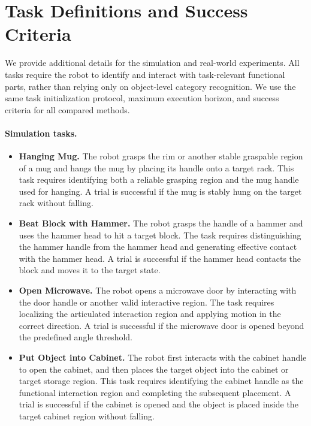 \section{Task Definitions and Success Criteria}
\label{app:tasks}

We provide additional details for the simulation and real-world experiments. All tasks require the robot to identify and interact with task-relevant functional parts, rather than relying only on object-level category recognition. We use the same task initialization protocol, maximum execution horizon, and success criteria for all compared methods.

\paragraph{Simulation tasks.}
\begin{itemize}
\item \textbf{Hanging Mug.} The robot grasps the rim or another stable graspable region of a mug and hangs the mug by placing its handle onto a target rack. This task requires identifying both a reliable grasping region and the mug handle used for hanging. A trial is successful if the mug is stably hung on the target rack without falling.

\item \textbf{Beat Block with Hammer.} The robot grasps the handle of a hammer and uses the hammer head to hit a target block. The task requires distinguishing the hammer handle from the hammer head and generating effective contact with the hammer head. A trial is successful if the hammer head contacts the block and moves it to the target state.

\item \textbf{Open Microwave.} The robot opens a microwave door by interacting with the door handle or another valid interactive region. The task requires localizing the articulated interaction region and applying motion in the correct direction. A trial is successful if the microwave door is opened beyond the predefined angle threshold.

\item \textbf{Put Object into Cabinet.} The robot first interacts with the cabinet handle to open the cabinet, and then places the target object into the cabinet or target storage region. This task requires identifying the cabinet handle as the functional interaction region and completing the subsequent placement. A trial is successful if the cabinet is opened and the object is placed inside the target cabinet region without falling.
\end{itemize}

